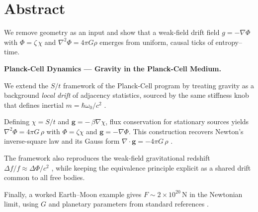 \section*{Abstract}
We remove geometry as an input and show that a weak-field drift field $g=-\nabla\Phi$ with $\Phi=\zeta\,\chi$ and $\nabla^2\Phi=4\pi G\rho$ emerges from uniform, causal ticks of entropy--time.

\noindent \textbf{Planck-Cell Dynamics — Gravity in the Planck-Cell Medium.}

We extend the $S/t$ framework of the Planck-Cell program by treating gravity as a background
\emph{local drift} of adjacency statistics, sourced by the same stiffness knob that defines inertial
$m = \hbar \omega_0 / c^2$ \cite{langstaff2025_temporal_relativity_entropy_clock,langstaff2025_planck_cell_kinematics,langstaff2025_planck_cell_mass}.


Defining $\chi=S/t$ and $\mathbf g=-\,\beta\nabla\chi$, flux conservation for stationary sources yields
$\nabla^2\Phi=4\pi G\,\rho$ with $\Phi=\zeta\chi$ and $\mathbf g=-\nabla\Phi$. This construction recovers Newton’s
inverse-square law and its Gauss form $\nabla\!\cdot\!\mathbf g=-4\pi G\,\rho$ \cite{newton1687principia}.

The framework also reproduces the weak-field gravitational redshift
$\Delta f/f\approx\Delta\Phi/c^2$ \cite{einstein1916foundation,will2014confrontation}, while keeping the equivalence
principle explicit as a shared drift common to all free bodies.

Finally, a worked Earth–Moon example gives
$F\!\sim\!2\times10^{20}\,\mathrm N$ in the Newtonian limit, using $G$ and planetary parameters from
standard references \cite{codata2018,nasa_earth_fact,nasa_moon_fact}.